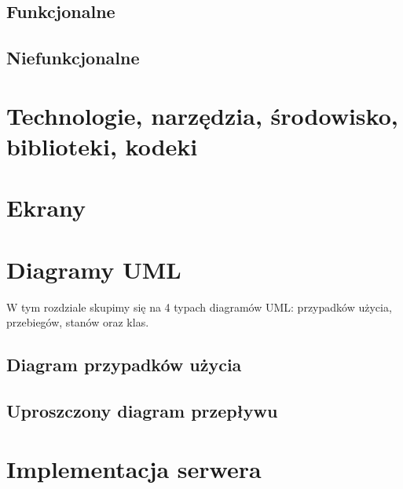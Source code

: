 \documentclass{article}
\begin{document}
	\subsection{Funkcjonalne}
	
	\subsection{Niefunkcjonalne}
	
	\section{Technologie, narzędzia, środowisko, biblioteki, kodeki}
	
	\section{Ekrany}
	

	\section{Diagramy UML}
	{W tym rozdziale skupimy się na 4 typach diagramów UML: przypadków użycia, przebiegów, stanów oraz klas.}
	\subsection{Diagram przypadków użycia}
	
	\subsection{Uproszczony diagram przepływu}
	
	\section{Implementacja serwera}
	
\end{document}
